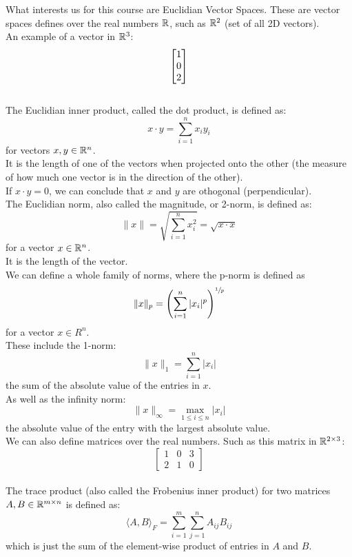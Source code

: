 \documentclass[12pt]{article}
\begin{document}
    What interests us for this course are
    Euclidian Vector Spaces.
    These are vector spaces defines over the real
    numbers $\mathbb{R}$, such as $\mathbb{R}^2$ (set of all 2D vectors). \\

    An example of a vector in $\mathbb{R}^3$:
    \[ \begin{bmatrix} 1 \\ 0 \\ 2 \end{bmatrix} \] \\

    The Euclidian inner product, called the dot product,
    is defined as:
    \[ x \cdot y = \sum_{i = 1}^nx_iy_i \]
    for vectors $x, y \in \mathbb{R}^n$. \\
    It is the length of one of the vectors when
    projected onto the other
    (the measure of how much one vector is in
    the direction of the other). \\
    If $x \cdot y = 0$,
    we can conclude that $x$ and $y$
    are othogonal (perpendicular). \\

    The Euclidian norm, also called the magnitude,
    or 2-norm,
    is defined as:
    \[ \|x\| = \sqrt{\sum_{i = 1}^nx_i^2} 
    = \sqrt{x \cdot x} \]
    for a vector $x \in \mathbb{R}^n$. \\
    It is the length of the vector. \\

    We can define a whole family of norms,
    where the p-norm is defined as
    \[ \| x \|_p = 
    \left( \sum_{i = 1}^n|x_i|^p  \right)^{\sfrac{1}{p}} \]
    for a vector $x \in R^n$. \\

    These include the 1-norm:
    \[ \| x \|_1 = \sum_{i = 1}^n|x_i| \]
    the sum of the absolute value of the entries in $x$. \\

    As well as the infinity norm:
    \[ \| x \|_\infty = \max_{1 \leq i \leq n} |x_i| \]
    the absolute value 
    of the entry with the largest absolute value. \\

    We can also define matrices over the real numbers.
    Such as this matrix in $\mathbb{R}^{2 \times 3}$:
    \[ \begin{bmatrix}
        1 & 0 & 3 \\
        2 & 1 & 0
    \end{bmatrix} \] \\

    The trace product
    (also called the Frobenius inner product)
    for two matrices
    $A, B \in \mathbb{R}^{m \times n}$ is defined as:
    \[ \langle A, B \rangle_F = 
    \sum_{i=1}^m\sum_{j=1}^n A_{ij}B_{ij} \]
    which is just the sum of the element-wise
    product of entries in $A$ and $B$. \\
\end{document}
